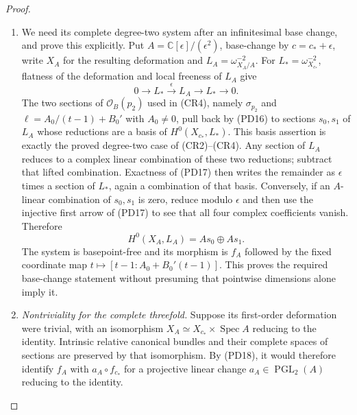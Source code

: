 \begin{proof}
\begin{enumerate}[label=\arabic*.,leftmargin=*]
\item We need its complete degree-two system after an infinitesimal base
change, and prove this explicitly. Put
$A=\mathbb C[\epsilon]/(\epsilon^2)$, base-change by
$c=c_*+\epsilon$, write $X_A$ for the resulting deformation and
$L_A=\omega_{X_A/A}^{-2}$. For $L_*=\omega_{X_{c_*}}^{-2}$,
flatness of the deformation and local freeness of $L_A$ give
\[
 0\longrightarrow L_*\xrightarrow{\ \epsilon\ }L_A
        \longrightarrow L_*\longrightarrow0.
 \tag{PD17}
\]
The two sections of $\mathcal O_B(p_2)$ used in (CR4), namely
$\sigma_{p_2}$ and $\ell=A_0/(t-1)+B_0'$ with $A_0\ne0$,
pull back by (PD16) to sections $s_0,s_1$ of $L_A$ whose reductions
are a basis of $H^0(X_{c_*},L_*)$. This basis assertion is exactly
the proved degree-two case of (CR2)--(CR4).
Any section of $L_A$ reduces to a complex linear combination of these
two reductions; subtract that lifted combination. Exactness of (PD17)
then writes the remainder as $\epsilon$ times a section of $L_*$,
again a combination of that basis. Conversely, if an $A$-linear
combination of $s_0,s_1$ is zero, reduce modulo $\epsilon$ and then
use the injective first arrow of (PD17) to see that all four complex
coefficients vanish. Therefore
\[
 H^0(X_A,L_A)=A s_0\oplus A s_1.
 \tag{PD18}
\]
The system is basepoint-free and its morphism is $f_A$ followed by
the fixed coordinate map $t\mapsto[t-1:A_0+B_0'(t-1)]$.
This proves the required base-change statement without presuming that
pointwise dimensions alone imply it.

\item \emph{Nontriviality for the complete threefold.}
Suppose its first-order deformation were trivial, with an isomorphism
$X_A\simeq X_{c_*}\times\operatorname{Spec}A$ reducing to the identity.
Intrinsic relative canonical bundles and their complete spaces of
sections are preserved by that isomorphism. By (PD18), it would
therefore identify $f_A$ with $a_A\circ f_{c_*}$ for a projective
linear change $a_A\in\operatorname{PGL}_2(A)$ reducing to the identity.


\end{enumerate}
\end{proof}
